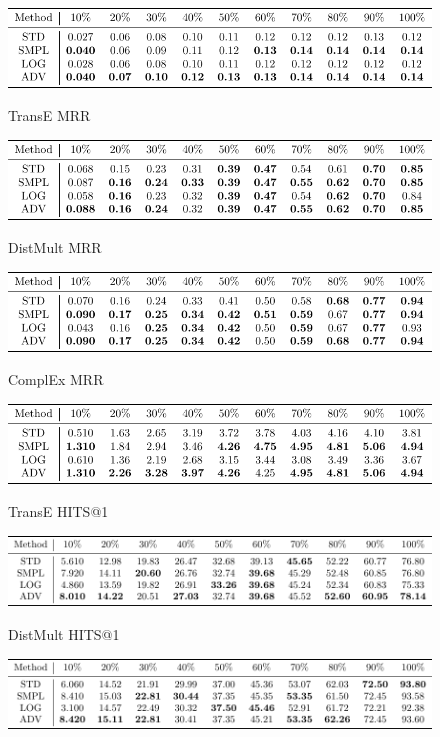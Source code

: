 \documentclass{article}
\begin{document}
\begin{figure}
\includegraphics[]{results_TransE_MRR}\\
\caption{TransE MRR}
\end{figure}\begin{figure}
\includegraphics[]{results_DistMult_MRR}\\
\caption{DistMult MRR}
\end{figure}\begin{figure}
\includegraphics[]{results_ComplEx_MRR}\\
\caption{ComplEx MRR}
\end{figure}\begin{figure}
\includegraphics[]{results_TransE_HITS@1}\\
\caption{TransE HITS@1}
\end{figure}\begin{figure}
\includegraphics[]{results_DistMult_HITS@1}\\
\caption{DistMult HITS@1}
\end{figure}\begin{figure}
\includegraphics[]{results_ComplEx_HITS@1}\\

\end{figure}
\end{document}
